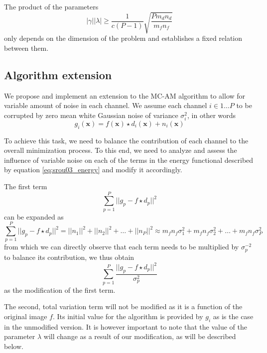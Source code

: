 \documentclass[12pt,notitlepage]{report}
\begin{document}
The product of the parameters 
\begin{equation}
\label{eq:srou03_lambda_estimate}
	|\gamma| |\lambda| \geq \frac{1}{c(P-1)} \sqrt{\frac{P m_d n_d}{m_f n_f}}
\end{equation}
only depends on the dimension of the problem and establishes a fixed relation between them.


\subsection{Algorithm extension}
\label{sec:srou03_extension}
We propose and implement an extension to the MC-AM algorithm to allow for variable amount of noise in each channel. We assume each channel $i \in {1 \dots P}$ to be corrupted by zero mean white Gaussian noise of variance $\sigma_i^2$, in other words
\begin{equation}
\label{eq:srou03_general_model_ext}
	g_i(\mathbf{x}) = f(\mathbf{x}) \star d_i(\mathbf{x}) + n_i(\mathbf{x}) 	
\end{equation}

To achieve this task, we need to balance the contribution of each channel to the overall minimization process. To this end, we need to analyze and assess the influence of variable noise on each of the terms in the energy functional described by equation \ref{eq:srou03_energy} and modify it accordingly. 

The first term  
\begin{equation}
\label{eq:srou03_term_1_ext}
	\sum_{p=1}^{P} || g_p - f \star d_p ||^2 	
\end{equation}
can be expanded as 
\begin{equation}
\label{eq:srou03_term_1_ext_exp}
	\sum_{p=1}^{P} || g_p - f \star d_p ||^2 = ||n_1||^2 + ||n_2||^2 + \dots + ||n_P||^2 \approx m_f n_f \sigma_1^2 + m_f n_f \sigma_2^2 + \dots + m_f n_f \sigma_P^2 	
\end{equation}
from which we can directly observe that each term needs to be multiplied by $\sigma_p^{-2}$ to balance its contribution, we thus obtain
\begin{equation}
\label{eq:srou03_term_1_ext}
	\sum_{p=1}^{P} \frac{|| g_p - f \star d_p ||^2}{\sigma_p^2} 	
\end{equation}
as the modification of the first term.

The second, total variation term will not be modified as it is a function of the original image $f$. Its initial value for the algorithm is provided by $g_i$ as is the case in the unmodified version.
It is however important to note that the value of the parameter $\lambda$ will change as a result of our modification, as will be described below. 
\end{document}
